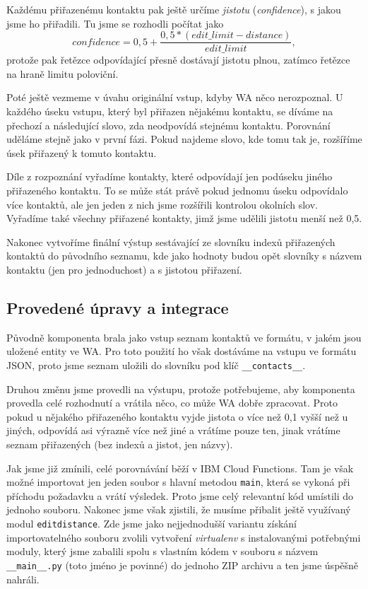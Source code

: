 Každému přiřazenému kontaktu pak ještě určíme \textit{jistotu} (\textit{confidence}),
s jakou jsme ho přiřadili. Tu jsme se rozhodli počítat jako
\[ confidence = 0,5 + \frac{0,5*(edit\_limit - distance)}{edit\_limit} ,\]
protože pak řetězce odpovídající přesně dostávají jistotu plnou, zatímco řetězce na
hraně limitu poloviční.

Poté ještě vezmeme v úvahu originální vstup, kdyby WA něco nerozpoznal. U každého
úseku vstupu, který byl přiřazen nějakému kontaktu, se díváme na přechozí a následující
slovo, zda neodpovídá stejnému kontaktu. Porovnání uděláme stejně jako v první fázi.
Pokud najdeme slovo, kde tomu tak je, rozšíříme úsek přiřazený k tomuto kontaktu.

Díle z rozpoznání vyřadíme kontakty, které odpovídají jen podúseku jiného
přiřazeného kontaktu. To se může stát právě pokud jednomu úseku odpovídalo více
kontaktů, ale jen jeden z nich jsme rozšířili kontrolou okolních slov. Vyřadíme také
všechny přiřazené kontakty, jimž jsme udělili jistotu menší než 0,5.

Nakonec vytvoříme finální výstup sestávající ze slovníku indexů přiřazených kontaktů
do původního seznamu, kde jako hodnoty budou opět slovníky s názvem kontaktu (jen pro
jednoduchost) a s jistotou přiřazení.

\subsection{Provedené úpravy a integrace}

Původně komponenta brala jako vstup seznam kontaktů ve formátu, v jakém jsou uložené
entity ve WA. Pro toto použití ho však dostáváme na vstupu ve formátu JSON, proto
jsme seznam uložili do slovníku pod klíč \texttt{\_\_contacts\_\_}.

Druhou změnu jsme provedli na výstupu, protože potřebujeme, aby komponenta provedla
celé rozhodnutí a vrátila něco, co může WA dobře zpracovat. Proto pokud u nějakého
přiřazeného kontaktu vyjde jistota o více než 0,1 vyšší než u jiných, odpovídá asi
výrazně více než jiné a vrátíme pouze
ten, jinak vrátíme seznam přiřazených (bez indexů a jistot, jen názvy).

Jak jsme již zmínili, celé porovnávání běží v IBM Cloud Functions. Tam je však možné
importovat jen jeden soubor s hlavní metodou \texttt{main}, která se vykoná při
příchodu požadavku a vrátí výsledek. Proto jsme celý relevantní kód umístili do
jednoho souboru. Nakonec jsme však zjistili, že musíme přibalit ještě využívaný
modul \texttt{editdistance}. Zde jsme jako nejjednodušší variantu získání importovatelného souboru
zvolili vytvoření \textit{virtualenv} s instalovanými potřebnými moduly,
který jsme zabalili spolu s vlastním kódem v souboru s názvem \texttt{\_\_main\_\_.py}
(toto jméno je povinné) do jednoho ZIP archivu a ten jsme úspěšně nahráli.